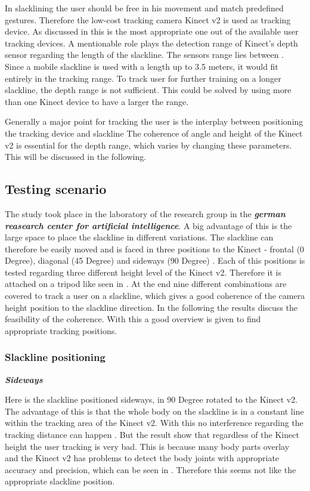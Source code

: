 In slacklining the user should be free in his movement and match predefined gestures. Therefore the low-cost tracking camera Kinect v2 is used as tracking device. As discussed in \textbf{} this is the most appropriate one out of the available user tracking devices.
A mentionable role plays the detection range of Kinect’s depth sensor regarding the length of the slackline. The sensors range lies between \textbf{}. Since a mobile slackline is used with a length up to 3.5 meters, it would fit entirely in the tracking range. To track user for further training on a longer slackline, the depth range is not sufficient. This could be solved by using more than one Kinect device to have a larger the range. 

Generally a major point for tracking the user is the interplay between positioning the tracking device and slackline The coherence of angle and height of the Kinect v2 is essential for the depth range, which varies by changing these parameters. This will be discussed in the following.

\subsection{Testing scenario}

The study took place in the laboratory of the research group in the \textit{\textbf{german reasearch center for artificial intelligence}}. A big advantage of this is the large space to place the slackline in different variations. The slackline can therefore be easily moved and is faced in three positions to the Kinect - frontal (0 Degree), diagonal (45 Degree) and sideways (90 Degree) \textbf{}. Each of this positions is tested regarding three different height level of the Kinect v2. Therefore it is attached on a tripod like seen in \textbf{}. At the end nine different combinations are covered to track a user on a slackline, which gives a good coherence of the camera height position to the slackline direction. In the following the results discuss the feasibility of the coherence. With this a good overview is given to find appropriate tracking positions.

\subsubsection{Slackline positioning}
\textit{\textbf{Sideways}}


Here is the slackline positioned sideways, in 90 Degree rotated to the Kinect v2. The advantage of this is that the whole body on the slackline is in a constant line within the tracking area of the Kinect v2. With this no interference regarding the tracking distance can happen \textbf{}. But the result show that regardless of the Kinect height the user tracking is very bad. This is because many body parts overlay and the Kinect v2 has problems to detect the body joints with appropriate accuracy and precision, which can be seen in \textbf{}. Therefore this seems not like the appropriate slackline position.


